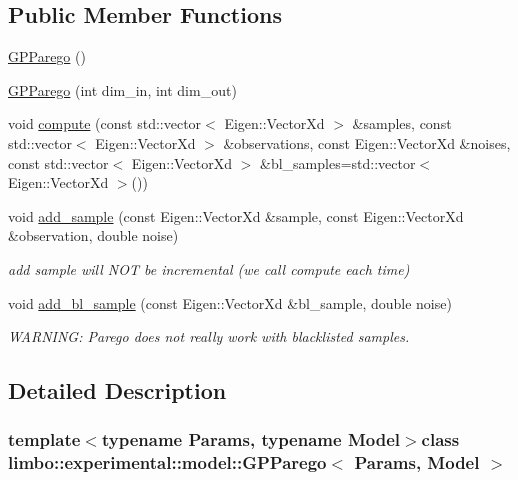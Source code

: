 \subsection*{Public Member Functions}
\begin{DoxyCompactItemize}
\item 
\hyperlink{classlimbo_1_1experimental_1_1model_1_1_g_p_parego_ac351d6798add22da5c6dd58ac4a00723}{G\+P\+Parego} ()
\item 
\hyperlink{classlimbo_1_1experimental_1_1model_1_1_g_p_parego_a1f0eb578140f01874b13bfca124c085c}{G\+P\+Parego} (int dim\+\_\+in, int dim\+\_\+out)
\item 
void \hyperlink{classlimbo_1_1experimental_1_1model_1_1_g_p_parego_a81f8ca3a7f114b015575ae7c64183ead}{compute} (const std\+::vector$<$ Eigen\+::\+Vector\+Xd $>$ \&samples, const std\+::vector$<$ Eigen\+::\+Vector\+Xd $>$ \&observations, const Eigen\+::\+Vector\+Xd \&noises, const std\+::vector$<$ Eigen\+::\+Vector\+Xd $>$ \&bl\+\_\+samples=std\+::vector$<$ Eigen\+::\+Vector\+Xd $>$())
\item 
void \hyperlink{classlimbo_1_1experimental_1_1model_1_1_g_p_parego_a81955696f79b4ac11a17d0faf28ccc31}{add\+\_\+sample} (const Eigen\+::\+Vector\+Xd \&sample, const Eigen\+::\+Vector\+Xd \&observation, double noise)
\begin{DoxyCompactList}\small\item\em add sample will N\+O\+T be incremental (we call compute each time) \end{DoxyCompactList}\item 
void \hyperlink{classlimbo_1_1experimental_1_1model_1_1_g_p_parego_aee0ce034411e11614069718a3140a3f8}{add\+\_\+bl\+\_\+sample} (const Eigen\+::\+Vector\+Xd \&bl\+\_\+sample, double noise)
\begin{DoxyCompactList}\small\item\em W\+A\+R\+N\+I\+N\+G\+: Parego does not really work with blacklisted samples. \end{DoxyCompactList}\end{DoxyCompactItemize}


\subsection{Detailed Description}
\subsubsection*{template$<$typename Params, typename Model$>$class limbo\+::experimental\+::model\+::\+G\+P\+Parego$<$ Params, Model $>$}

